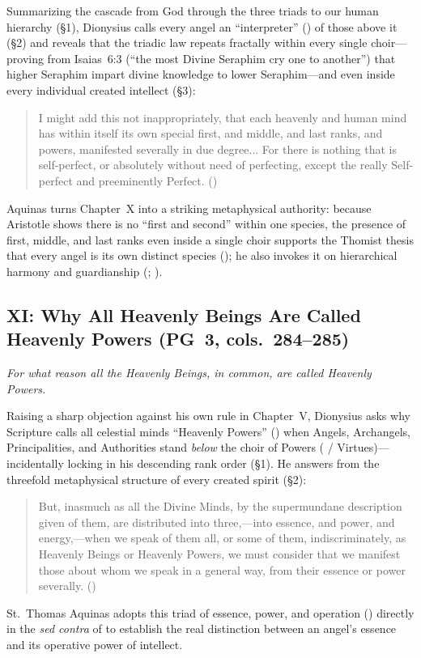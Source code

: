 Summarizing the cascade from God through the three triads to our human hierarchy (\S 1), Dionysius calls every angel an ``interpreter'' () of those above it (\S 2) and reveals that the triadic law repeats fractally within every single choir---proving from Isaias~6:3 (``the most Divine Seraphim cry one to another'') that higher Seraphim impart divine knowledge to lower Seraphim---and even inside every individual created intellect (\S 3):
\begin{quotation}
I might add this not inappropriately, that each heavenly and human mind has within itself its own special first, and middle, and last ranks, and powers, manifested severally in due degree... For there is nothing that is self-perfect, or absolutely without need of perfecting, except the really Self-perfect and preeminently Perfect. ()
\end{quotation}
Aquinas turns Chapter~X into a striking metaphysical authority: because Aristotle shows there is no ``first and second'' within one species, the presence of first, middle, and last ranks even inside a single choir supports the Thomist thesis that every angel is its own distinct species (); he also invokes it on hierarchical harmony and guardianship (; ).

\subsection{XI: Why All Heavenly Beings Are Called Heavenly Powers (PG~3, cols.~284--285)}
\label{sec:ch-xi}
\emph{For what reason all the Heavenly Beings, in common, are called Heavenly Powers.}

Raising a sharp objection against his own rule in Chapter~V, Dionysius asks why Scripture calls all celestial minds ``Heavenly Powers'' () when Angels, Archangels, Principalities, and Authorities stand \emph{below} the choir of Powers ( / Virtues)---incidentally locking in his descending rank order (\S 1). He answers from the threefold metaphysical structure of every created spirit (\S 2):
\begin{quotation}
But, inasmuch as all the Divine Minds, by the supermundane description given of them, are distributed into three,---into essence, and power, and energy,---when we speak of them all, or some of them, indiscriminately, as Heavenly Beings or Heavenly Powers, we must consider that we manifest those about whom we speak in a general way, from their essence or power severally. ()
\end{quotation}
St.~Thomas Aquinas adopts this triad of essence, power, and operation () directly in the \emph{sed contra} of  to establish the real distinction between an angel's essence and its operative power of intellect.

